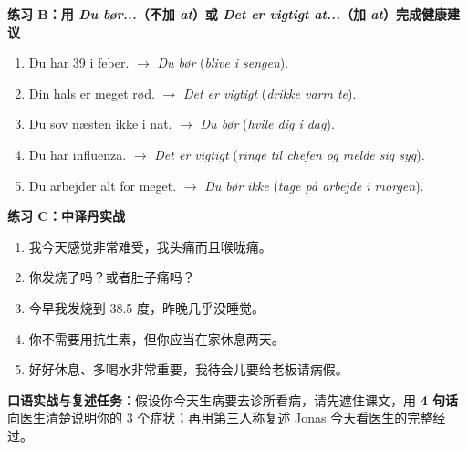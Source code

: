 \textbf{练习 B：用 \textit{Du bør...}（不加 \textit{at}）或 \textit{Det er vigtigt at...}（加 \textit{at}）完成健康建议}
\begin{enumerate}
  \item Du har 39 i feber. $\rightarrow$ \textit{Du bør} \underline{\hspace{4.5cm}} (\textit{blive i sengen}).
  \item Din hals er meget rød. $\rightarrow$ \textit{Det er vigtigt} \underline{\hspace{4.5cm}} (\textit{drikke varm te}).
  \item Du sov næsten ikke i nat. $\rightarrow$ \textit{Du bør} \underline{\hspace{4.5cm}} (\textit{hvile dig i dag}).
  \item Du har influenza. $\rightarrow$ \textit{Det er vigtigt} \underline{\hspace{4.5cm}} (\textit{ringe til chefen og melde sig syg}).
  \item Du arbejder alt for meget. $\rightarrow$ \textit{Du bør ikke} \underline{\hspace{4.5cm}} (\textit{tage på arbejde i morgen}).
\end{enumerate}

\textbf{练习 C：中译丹实战}
\begin{enumerate}
  \item 我今天感觉非常难受，我头痛而且喉咙痛。
  \item 你发烧了吗？或者肚子痛吗？
  \item 今早我发烧到 38.5 度，昨晚几乎没睡觉。
  \item 你不需要用抗生素，但你应当在家休息两天。
  \item 好好休息、多喝水非常重要，我待会儿要给老板请病假。
\end{enumerate}


\textbf{口语实战与复述任务}：假设你今天生病要去诊所看病，请先遮住课文，用 \textbf{4 句话} 向医生清楚说明你的 3 个症状；再用第三人称复述 Jonas 今天看医生的完整经过。

